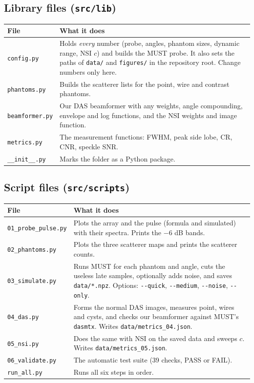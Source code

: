 \documentclass[11pt,a4paper]{article}
\newcommand{\file}[1]{\texttt{#1}}
\begin{document}
\subsection{Library files (\file{src/lib})}
\begin{center}
\small
\begin{tabular}{@{}p{3.6cm}p{11.0cm}@{}}
\toprule
\textbf{File} & \textbf{What it does}\\
\midrule
\file{config.py} & Holds \emph{every} number (probe, angles, phantom sizes, dynamic range, NSI $c$) and builds the MUST probe. It also sets the paths of \file{data/} and \file{figures/} in the repository root. Change numbers only here.\\
\file{phantoms.py} & Builds the scatterer lists for the point, wire and contrast phantoms.\\
\file{beamformer.py} & Our DAS beamformer with any weights, angle compounding, envelope and log functions, and the NSI weights and image function.\\
\file{metrics.py} & The measurement functions: FWHM, peak side lobe, CR, CNR, speckle SNR.\\
\file{\_\_init\_\_.py} & Marks the folder as a Python package.\\
\bottomrule
\end{tabular}
\end{center}

\subsection{Script files (\file{src/scripts})}
\begin{center}
\small
\begin{tabular}{@{}p{3.6cm}p{11.0cm}@{}}
\toprule
\textbf{File} & \textbf{What it does}\\
\midrule
\file{01\_probe\_pulse.py} & Plots the array and the pulse (formula and simulated) with their spectra. Prints the $-6$ dB bands.\\
\file{02\_phantoms.py} & Plots the three scatterer maps and prints the scatterer counts.\\
\file{03\_simulate.py} & Runs MUST for each phantom and angle, cuts the useless late samples, optionally adds noise, and saves \file{data/*.npz}. Options: \texttt{-{}-quick}, \texttt{-{}-medium}, \texttt{-{}-noise}, \texttt{-{}-only}.\\
\file{04\_das.py} & Forms the normal DAS images, measures point, wires and cysts, and checks our beamformer against MUST's \texttt{dasmtx}. Writes \file{data/metrics\_04.json}.\\
\file{05\_nsi.py} & Does the same with NSI on the saved data and sweeps $c$. Writes \file{data/metrics\_05.json}.\\
\file{06\_validate.py} & The automatic test suite (39 checks, PASS or FAIL).\\
\file{run\_all.py} & Runs all six steps in order.\\
\bottomrule
\end{tabular}
\end{center}
\end{document}
